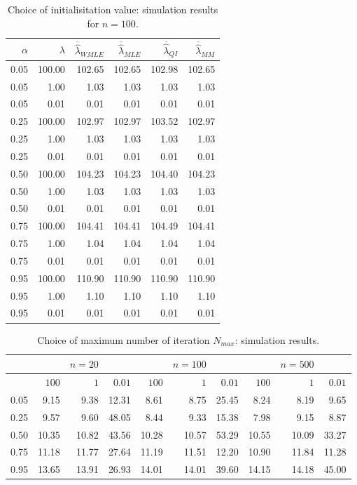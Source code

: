 \begin{table}[ht]
\centering
\begin{tabular}{|rr||rrrr|}
\hline
 $\alpha$ & $\lambda$ & $\overline{\hat\lambda}_{WMLE}$ & $\overline{\hat\lambda}_{MLE}$ & $\overline{\hat\lambda}_{QI}$ & $\overline{\hat\lambda}_{MM}$ \\ 
  \hline
  \hline
0.05 & 100.00 & 102.65 & 102.65 & 102.98 & 102.65 \\ 
  0.05 & 1.00 & 1.03 & 1.03 & 1.03 & 1.03 \\ 
  0.05 & 0.01 & 0.01 & 0.01 & 0.01 & 0.01 \\ 
  0.25 & 100.00 & 102.97 & 102.97 & 103.52 & 102.97 \\ 
  0.25 & 1.00 & 1.03 & 1.03 & 1.03 & 1.03 \\ 
  0.25 & 0.01 & 0.01 & 0.01 & 0.01 & 0.01 \\ 
  0.50 & 100.00 & 104.23 & 104.23 & 104.40 & 104.23 \\ 
  0.50 & 1.00 & 1.03 & 1.03 & 1.03 & 1.03 \\ 
  0.50 & 0.01 & 0.01 & 0.01 & 0.01 & 0.01 \\ 
  0.75 & 100.00 & 104.41 & 104.41 & 104.49 & 104.41 \\ 
  0.75 & 1.00 & 1.04 & 1.04 & 1.04 & 1.04 \\ 
  0.75 & 0.01 & 0.01 & 0.01 & 0.01 & 0.01 \\ 
  0.95 & 100.00 & 110.90 & 110.90 & 110.90 & 110.90 \\ 
  0.95 & 1.00 & 1.10 & 1.10 & 1.10 & 1.10 \\ 
  0.95 & 0.01 & 0.01 & 0.01 & 0.01 & 0.01 \\ 
   \hline
\end{tabular}
\caption{Choice of initialisitation value: simulation results for $n = 100$.}\label{tab:sim:init2}
\end{table}

\begin{table}[ht]
\centering
\begin{tabular}{|r||rrr||rrr||rrr|}
  \hline
& & $n = 20$ & & & $n = 100$ & & & $n = 500$ & \\
  \hline
  \hline
\diagbox[]{$\alpha$}{$\lambda$} & $100$ & $1$ & $0.01$ & $100$ & $1$ & $0.01$ & $100$ & $1$ & $0.01$ \\ 
  \hline
  \hline
0.05 & 9.15 & 9.38 & 12.31 & 8.61 & 8.75 & 25.45 &  8.24 & 8.19 & 9.65  \\ 
  0.25 & 9.57 & 9.60 & 48.05 & 8.44 & 9.33 & 15.38 & 7.98 & 9.15 & 8.87 \\ 
  0.50 & 10.35 & 10.82 & 43.56 & 10.28 & 10.57 & 53.29 & 10.55 & 10.09 & 33.27 \\ 
  0.75 & 11.18 & 11.77 & 27.64 & 11.19 & 11.51 & 12.20 & 10.90 & 11.84 & 11.28\\ 
  0.95 & 13.65 & 13.91 & 26.93 &  14.01 & 14.01 & 39.60 & 14.15 & 14.18 & 45.00 \\ 
  \hline
\end{tabular}
\caption{Choice of maximum number of iteration $N_{max}$: simulation results.}\label{tab:sim:Nmax}
\end{table}

